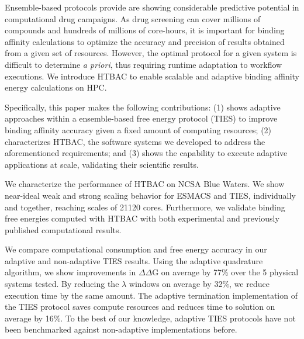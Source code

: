 Ensemble-based protocols provide are showing considerable predictive potential 
in computational drug campaigns. As drug screening can cover millions of
compounds and hundreds of millions of core-hours, it is important for
binding affinity calculations to optimize the accuracy and precision of
results obtained from a given set of resources. However, the optimal protocol
for a given system is difficult to determine {\it a priori}, thus requiring
runtime adaptation to workflow executions. We introduce HTBAC to enable 
scalable and adaptive binding affinity energy calculations on HPC. 

Specifically, this paper makes the following contributions: (1) shows
adaptive approaches within a ensemble-based free energy protocol (TIES) to
improve binding affinity accuracy given a fixed amount of computing
resources; (2) characterizes HTBAC, the software systems we developed to address
the aforementioned requirements;
and (3) shows the capability to execute adaptive applications at scale, 
validating their scientific results.

We characterize the performance of HTBAC on NCSA Blue Waters. We show
near-ideal weak and strong scaling behavior for ESMACS and TIES, individually 
and together, reaching scales of 21120 cores. 
Furthermore, we validate binding free energies computed with HTBAC 
with both experimental and previously published computational results.


We compare computational consumption and free energy accuracy in our adaptive
and non-adaptive TIES results. Using the adaptive quadrature algorithm, we
show improvements in $\Delta \Delta$G on average by 77\% over the 5 physical
systems tested. By reducing the $\lambda$ windows on average by 32\%, we
reduce execution time by the same amount. The adaptive
termination implementation of the TIES protocol saves compute resources and
reduces time to solution on average by 16\%. To the best of our knowledge,
adaptive TIES protocols have not been benchmarked against non-adaptive
implementations before.

